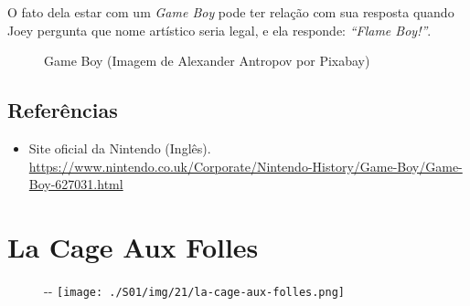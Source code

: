 O fato dela estar com um \emph{Game Boy} pode ter relação com sua
resposta quando Joey pergunta que nome artístico seria legal, e ela
responde: \emph{``Flame Boy!''}.

\begin{figure}
  \centering
    \caption{Game Boy (Imagem de Alexander Antropov por Pixabay)\label{fig:game-boy-imagem-de-alexander-antropov-por-pixabay}}
\end{figure}

\hypertarget{referuxeancias-5}{%
\subsection{Referências}\label{referuxeancias-5}}

\begin{itemize}
\tightlist
\item
  \sloppy Site oficial da Nintendo (Inglês). \url{https://www.nintendo.co.uk/Corporate/Nintendo-History/Game-Boy/Game-Boy-627031.html}
\end{itemize}

\hypertarget{la-cage-aux-folles}{%
\section{La Cage Aux Folles}\label{la-cage-aux-folles}}

\begin{figure}[!ht]
  \begin{adjustwidth}{-\oddsidemargin-1in}{-\rightmargin}
    \centering
    \texttt{[image: ./S01/img/21/la-cage-aux-folles.png]}
  \end{adjustwidth}
\end{figure}

